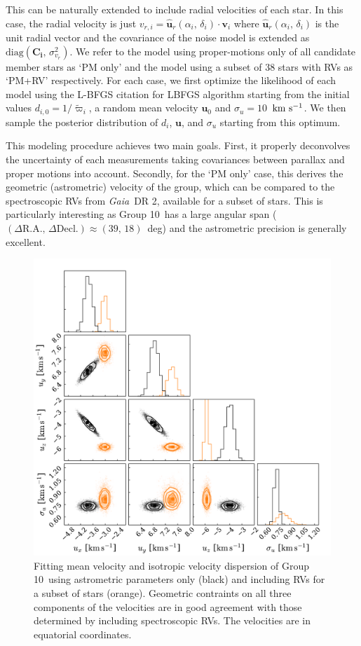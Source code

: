 \documentclass[modern,letterpaper]{aastex61}
\newcommand{\project}[1]{\textsl{#1}}
\newcommand{\gaia}{\project{Gaia}}
\newcommand{\groupTen}{Group 10}
\newcommand{\bs}[1]{\boldsymbol{#1}}
\newcommand{\mat}[1]{\mathbf{#1}}
\renewcommand{\vec}[1]{\bs{#1}}
\newcommand{\kms}{\ensuremath{\rm km~s^{-1}}}
\newcommand{\todo}[1]{{\color{crimson}#1}}
\begin{document}
This can be naturally extended to include radial velocities of each star.
In this case, the radial velocity is just $v_{r,i} =
\hat{\vec{u}}_r(\alpha_i,\,\delta_i) \cdot \vec{v}_i$
where $\hat{\vec{u}}_r(\alpha_i,\,\delta_i)$ is the unit radial vector
and the covariance of the noise model
is extended as $\mathrm{diag}(\mat{C_i},\,\sigma_{v_r}^2)$.
We refer to the model using proper-motions only of all candidate member stars as `PM only'
and the model using a subset of 38 stars with RVs as `PM+RV' respectively.
For each case, we first optimize the likelihood of each model using the L-BFGS \todo{citation for LBFGS} algorithm starting from
the initial values $d_{i,0} = 1/{\tilde \varpi_i}$, a random mean velocity
$\vec{u}_0$ and $\sigma_u=10$~\kms.
We then sample the posterior distribution of $d_i$, $\vec{u}$, and $\sigma_u$
starting from this optimum.

This modeling procedure achieves two main goals.
First, it properly deconvolves the uncertainty of each measurements taking
covariances between parallax and proper motions into account.
Secondly, for the `PM only' case, this derives the geometric (astrometric) velocity of the group, which can be compared to the spectroscopic RVs from \gaia\ DR 2, available for a subset of stars.
This is particularly interesting as \groupTen\ has a large angular span
($(\Delta\mathrm{R.A.},\,\Delta\mathrm{Decl.})\approx(39,\,18)$~deg)
and the astrometric precision is generally excellent.


\begin{figure}
  \includegraphics[width=0.95\linewidth]{isotropic.pdf}
  \caption{Fitting mean velocity and isotropic velocity dispersion of \groupTen\
    using astrometric parameters only (black) and including RVs for a subset
    of stars (orange).
    Geometric contraints on all three components of the velocities are in good
    agreement with those determined by including spectroscopic RVs.
    The velocities are in equatorial coordinates.
    }
  \label{fig:fit}
\end{figure}
\end{document}
